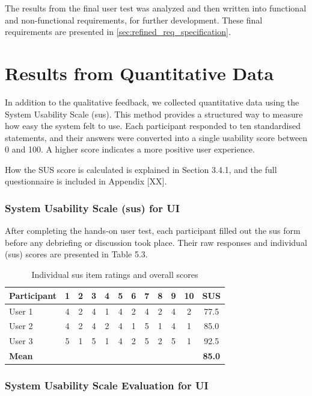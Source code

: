The results from the final user test was analyzed and then written into functional and non-functional requirements, for further development. These final requirements are presented in \ref{sec:refined_req_specification}.

\section{Results from Quantitative Data}
In addition to the qualitative feedback, we collected quantitative data using the System Usability Scale (\acrshort{sus}). This method provides a structured way to measure how easy the system felt to use. Each participant responded to ten standardised statements, and their answers were converted into a single usability score between 0 and 100. A higher score indicates a more positive user experience.

How the SUS score is calculated is explained in Section 3.4.1, and the full questionnaire is included in Appendix [XX].

\subsubsection*{System Usability Scale (\acrshort{sus}) for UI}
After completing the hands-on user test, each participant filled out the \acrshort{sus} form before any debriefing or discussion took place. Their raw responses and individual (\acrshort{sus}) scores are presented in Table 5.3.

\begin{table}[htbp]
\centering
\begin{tabular}{@{}lccccccccccc@{}}
\toprule
\textbf{Participant} & \textbf{1} & \textbf{2} & \textbf{3} & \textbf{4} & \textbf{5} & \textbf{6} & \textbf{7} & \textbf{8} & \textbf{9} & \textbf{10} & \textbf{SUS} \\ 
\midrule
User 1 & 4 & 2 & 4 & 1 & 4 & 2 & 4 & 2 & 4 & 2 & 77.5 \\
User 2 & 4 & 2 & 4 & 2 & 4 & 1 & 5 & 1 & 4 & 1 & 85.0 \\
User 3 & 5 & 1 & 5 & 1 & 4 & 2 & 5 & 2 & 5 & 1 & 92.5 \\
\midrule
\textbf{Mean} &  &  &  &  &  &  &  &  &  &  & \textbf{85.0} \\
\bottomrule
\end{tabular}
\label{tab:sus-scores}
\caption{Individual \acrshort{sus} item ratings and overall scores}
\end{table}

\subsubsection{System Usability Scale Evaluation for UI}


